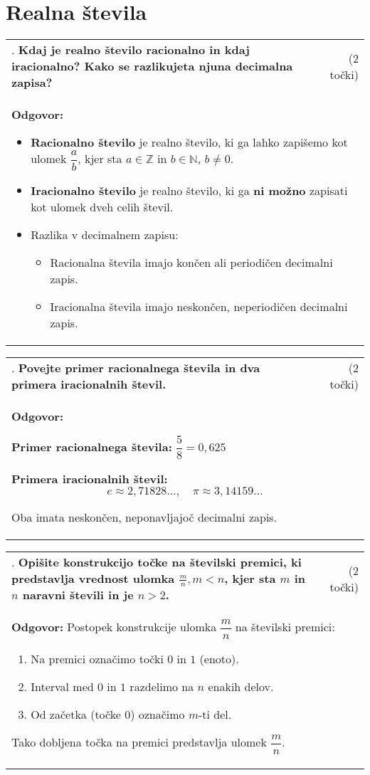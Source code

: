 \documentclass[12pt]{article}
\newcounter{vprasanje}[section]
\renewcommand{\thevprasanje}{\roman{vprasanje}}
\newcommand{\vprasanje}[2]{%
  \stepcounter{vprasanje}%
  \textbf{\thevprasanje}. \textbf{#1} & (#2) \\
}
\newcommand{\odgovor}[1]{%
  \multicolumn{2}{p{\dimexpr\textwidth-2\tabcolsep\relax}}{%
    \small \textbf{Odgovor:} #1%
  } \\[1em]%
}
\newcommand{\naslov}[1]{%
  \vspace{1em} 
  \section{#1}
  \addcontentsline{toc}{section}{\protect\numberline{}#1}%
}
\newcommand{\razmak}[1]{%
  \vspace{#1}
}
\begin{document}
\naslov{Realna števila}

\begin{tabularx}{\textwidth}{X r}
\vprasanje{Kdaj je realno število racionalno in kdaj iracionalno? Kako se razlikujeta njuna decimalna zapisa?}{2 točki}
\odgovor{%
\begin{itemize}
	\item \textbf{Racionalno število} je realno število, ki ga lahko zapišemo kot ulomek $\dfrac{a}{b}$, kjer sta $a \in \mathbb{Z}$ in $b \in \mathbb{N}$, $b \ne 0$.

	\item \textbf{Iracionalno število} je realno število, ki ga \textbf{ni možno} zapisati kot ulomek dveh celih števil.

	\item Razlika v decimalnem zapisu:
	\begin{itemize}
  		\item Racionalna števila imajo končen ali periodičen decimalni zapis.
  		\item Iracionalna števila imajo neskončen, neperiodičen decimalni zapis.
	\end{itemize}
\end{itemize}
}
\end{tabularx}

\begin{tabularx}{\textwidth}{X r}
\vprasanje{Povejte primer racionalnega števila in dva primera iracionalnih števil.}{2 točki}
\odgovor{%

\textbf{Primer racionalnega števila:} $\dfrac{5}{8} = 0{,}625$

\textbf{Primera iracionalnih števil:}
\[
e \approx 2{,}71828\ldots,\quad \pi \approx 3{,}14159\ldots
\]

Oba imata neskončen, neponavljajoč decimalni zapis.
}
\end{tabularx}

\razmak{1em}

\begin{tabularx}{\textwidth}{X r}
\vprasanje{Opišite konstrukcijo točke na številski premici, ki predstavlja vrednost ulomka $\frac{m}{n}, m<n$, kjer sta $m$ in $n$ naravni števili in je $n>2$.}{2 točki}
\odgovor{%
Postopek konstrukcije ulomka $\dfrac{m}{n}$ na številski premici:
\begin{enumerate}
  \item Na premici označimo točki $0$ in $1$ (enoto).
  \item Interval med $0$ in $1$ razdelimo na $n$ enakih delov.
  \item Od začetka (točke $0$) označimo $m$-ti del.
\end{enumerate}
Tako dobljena točka na premici predstavlja ulomek $\dfrac{m}{n}$.
}
\end{tabularx}
\end{document}
